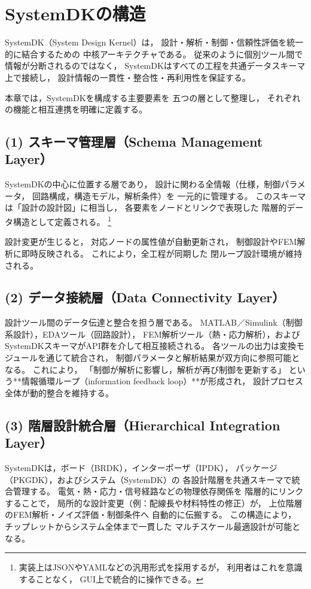\section{SystemDKの構造}

SystemDK（System Design Kernel）は，
設計・解析・制御・信頼性評価を統一的に結合するための
中核アーキテクチャである。
従来のように個別ツール間で情報が分断されるのではなく，
SystemDKはすべての工程を共通データスキーマ上で接続し，
設計情報の一貫性・整合性・再利用性を保証する。

本章では，SystemDKを構成する主要要素を
五つの層として整理し，
それぞれの機能と相互連携を明確に定義する。

\subsection{(1) スキーマ管理層（Schema Management Layer）}
SystemDKの中心に位置する層であり，
設計に関わる全情報（仕様，制御パラメータ，
回路構成，構造モデル，解析条件）を
一元的に管理する。
このスキーマは「設計の設計図」に相当し，
各要素をノードとリンクで表現した
階層的データ構造として定義される。
\footnote{実装上はJSONやYAMLなどの汎用形式を採用するが，
利用者はこれを意識することなく，
GUI上で統合的に操作できる。}

設計変更が生じると，
対応ノードの属性値が自動更新され，
制御設計やFEM解析に即時反映される。
これにより，全工程が同期した
閉ループ設計環境が維持される。

\subsection{(2) データ接続層（Data Connectivity Layer）}
設計ツール間のデータ伝達と整合を担う層である。
MATLAB／Simulink（制御系設計），EDAツール（回路設計），
FEM解析ツール（熱・応力解析），および
SystemDKスキーマがAPI群を介して相互接続される。
各ツールの出力は変換モジュールを通じて統合され，
制御パラメータと解析結果が双方向に参照可能となる。
これにより，
「制御が解析に影響し，解析が再び制御を更新する」
という**情報循環ループ（information feedback loop）**が形成され，
設計プロセス全体が動的整合を維持する。

\subsection{(3) 階層設計統合層（Hierarchical Integration Layer）}
SystemDKは，ボード（BRDK），インターポーザ（IPDK），
パッケージ（PKGDK），およびシステム（SystemDK）の
各設計階層を共通スキーマで統合管理する。
電気・熱・応力・信号経路などの物理依存関係を
階層的にリンクすることで，
局所的な設計変更（例：配線長や材料特性の修正）が，
上位階層のFEM解析・ノイズ評価・制御条件へ
自動的に伝搬する。
この構造により，
チップレットからシステム全体まで一貫した
マルチスケール最適設計が可能となる。

